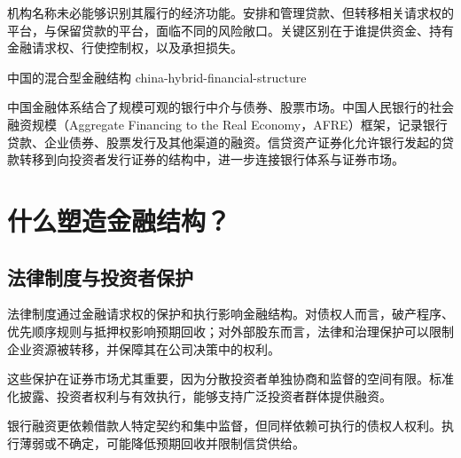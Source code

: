 \begin{tcolorbox}[
  enhanced,
  breakable,
  colback=white,
  colframe=FinanceBlue,
  boxrule=0.7pt,
  sharp corners,
  borderline west={2.2pt}{0pt}{FinanceBlue},
  title=\textbf{金融视角：透过机构名称看经济功能},
  coltitle=white,
  colbacktitle=FinanceBlue,
  fonttitle=\bfseries,
  before skip=1.2em,
  after skip=1.2em
]

机构名称未必能够识别其履行的经济功能。安排和管理贷款、但转移相关请求权的平台，与保留贷款的平台，面临不同的风险敞口。关键区别在于谁提供资金、持有金融请求权、行使控制权，以及承担损失。








\end{tcolorbox}

\begin{example}{中国的混合型金融结构}
{china-hybrid-financial-structure}

中国金融体系结合了规模可观的银行中介与债券、股票市场。中国人民银行的社会融资规模（Aggregate Financing to the Real Economy，AFRE）框架，记录银行贷款、企业债券、股票发行及其他渠道的融资。信贷资产证券化允许银行发起的贷款转移到向投资者发行证券的结构中，进一步连接银行体系与证券市场。









\end{example}

\section{什么塑造金融结构？}

\subsection{法律制度与投资者保护}

法律制度通过金融请求权的保护和执行影响金融结构。对债权人而言，破产程序、优先顺序规则与抵押权影响预期回收；对外部股东而言，法律和治理保护可以限制企业资源被转移，并保障其在公司决策中的权利。

这些保护在证券市场尤其重要，因为分散投资者单独协商和监督的空间有限。标准化披露、投资者权利与有效执行，能够支持广泛投资者群体提供融资。

银行融资更依赖借款人特定契约和集中监督，但同样依赖可执行的债权人权利。执行薄弱或不确定，可能降低预期回收并限制信贷供给。

